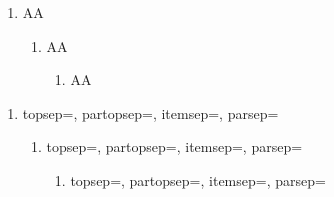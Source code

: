\documentclass[10pt]{article}
\newcommand{\printverticalvalues}{
        topsep=\the\topsep, 
        partopsep=\the\partopsep, 
        itemsep=\the\itemsep, 
        parsep=\the\parsep
    
    
    }
\begin{document}
\begin{enumerate}
    \item AA
    \begin{enumerate}
        \item AA
        \begin{enumerate}
            \item AA
        \end{enumerate}
    \end{enumerate}
\end{enumerate}

\begin{enumerate}
    \item \printverticalvalues
    \begin{enumerate}
        \item \printverticalvalues
        \begin{enumerate}
            \item \printverticalvalues
        \end{enumerate}
    \end{enumerate}
\end{enumerate}
\end{document}
